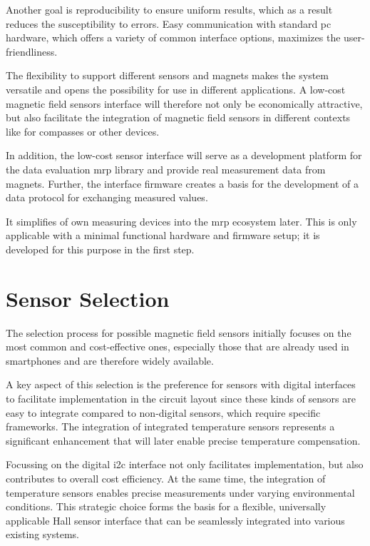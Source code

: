 Another goal is reproducibility to ensure uniform results, which as a
result reduces the susceptibility to errors. Easy communication with
standard \gls{pc} hardware, which offers a variety of common interface
options, maximizes the user-friendliness.

The flexibility to support different sensors and magnets makes the
system versatile and opens the possibility for use in different
applications. A low-cost magnetic field sensors interface will therefore
not only be economically attractive, but also facilitate the integration
of magnetic field sensors in different contexts like for compasses or
other devices.

In addition, the low-cost sensor interface will serve as a development
platform for the data evaluation \gls{mrp} library and provide real
measurement data from magnets. Further, the interface firmware creates a
basis for the development of a data protocol for exchanging measured
values.

It simplifies of own measuring devices into the \gls{mrp} ecosystem
later. This is only applicable with a minimal functional hardware and
firmware setup; it is developed for this purpose in the first step.

\newpage

\hypertarget{sensor-selection}{%
\section{Sensor Selection}\label{sensor-selection}}

The selection process for possible magnetic field sensors initially
focuses on the most common and cost-effective ones, especially those
that are already used in smartphones and are therefore widely available.

A key aspect of this selection is the preference for sensors with
digital interfaces to facilitate implementation in the circuit layout
since these kinds of sensors are easy to integrate compared to
non-digital sensors, which require specific frameworks. The integration
of integrated temperature sensors represents a significant enhancement
that will later enable precise temperature compensation.

Focussing on the digital \gls{i2c} interface not only facilitates
implementation, but also contributes to overall cost efficiency. At the
same time, the integration of temperature sensors enables precise
measurements under varying environmental conditions. This strategic
choice forms the basis for a flexible, universally applicable Hall
sensor interface that can be seamlessly integrated into various existing
systems.

